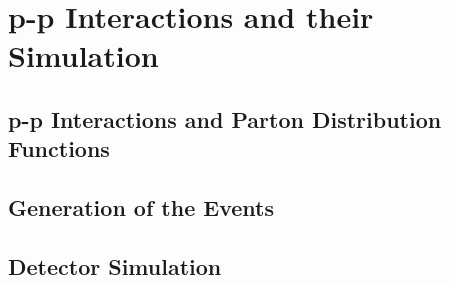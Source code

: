 \section{p-p Interactions and their Simulation}
\label{chap:event:MC}

\subsection{p-p Interactions and Parton Distribution Functions}

\subsection{Generation of the Events}

\subsection{Detector Simulation}
